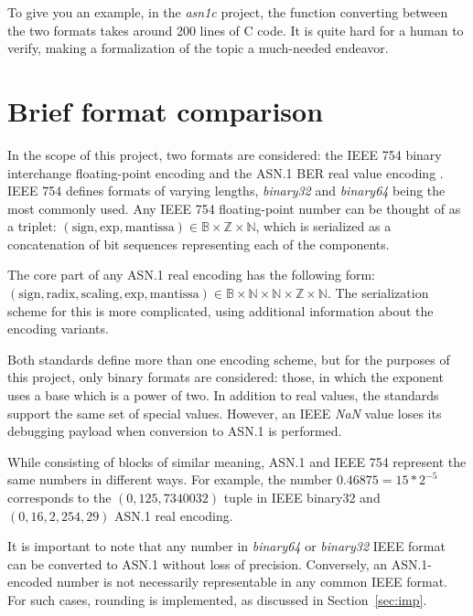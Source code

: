 \documentclass[sigplan]{acmart}
\newcommand{\N}{\mathbb{N}}
\newcommand{\Z}{\mathbb{Z}}
\newcommand{\bool}{\mathbb{B}}
\begin{document}
To give you an example, in the \emph{asn1c} \cite{walkinopen} project, the function
converting between the two formats takes around 200 lines of C code.
It is quite hard for a human to verify, making a formalization of the topic a much-needed endeavor.

\section{Brief format comparison}

In the scope of this project, two formats are considered: the IEEE 754 binary
interchange floating-point encoding \cite{5976968} and the ASN.1 BER real value encoding \cite{ISO8825}.
IEEE 754 defines formats of varying lengths, \emph{binary32} and \emph{binary64}
being the most commonly used. Any IEEE 754 floating-point number can be thought of as a triplet:
$(\mathrm{sign}, \mathrm{exp}, \mathrm{mantissa}) \in \bool \times \Z \times \N$,
which is serialized as a concatenation of bit sequences representing each of the components.

The core part of any ASN.1 real encoding has the following form:
$ (\mathrm{sign},\mathrm{radix},\mathrm{scaling},\mathrm{exp},\mathrm{mantissa})
\in \bool \times \N \times \N \times \Z \times \N$.
The serialization scheme for this is more complicated, using additional
information about the encoding variants.

Both standards define more than one encoding scheme, but for the purposes of
this project, only binary formats are considered: those, in which the exponent uses a base
which is a power of two. In addition to real values, the standards support the same set
of special values. However, an IEEE \emph{NaN} value loses its debugging payload when conversion to
ASN.1 is performed.

While consisting of blocks of similar meaning, ASN.1 and IEEE 754 represent the same numbers in different
ways. For example, the number $0.46875 = 15*2^{-5}$ corresponds to the $(0, 125, 7340032)$ tuple
in IEEE binary32 and $(0, 16, 2, 254, 29)$ ASN.1 real encoding.

It is important to note that any number in \emph{binary64} or \emph{binary32} IEEE format can
be converted to ASN.1 without loss of precision. Conversely, an ASN.1-encoded
number is not necessarily representable in any common IEEE format. For such cases,
rounding is implemented, as discussed in Section~\ref{sec:imp}.
\end{document}
